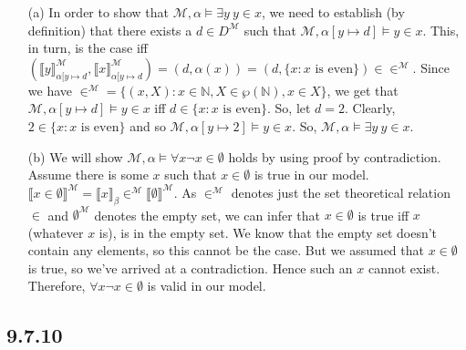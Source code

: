 \begin{enumerate}

  \item[(a)] In order to show that $\mathcal{M},\alpha\vDash \exists
    y~y\in x$, we need to establish (by definition) that there exists
    a $d\in D^\mathcal{M}$ such that $\mathcal{M},\alpha[y\mapsto
    d]\vDash y\in x$. This, in turn, is the case iff $(\llbracket
    y\rrbracket^\mathcal{M}_{\alpha[y\mapsto d}, \llbracket
    x\rrbracket^\mathcal{M}_{\alpha[y\mapsto d})=(d, \alpha(x))=(d,
    \{x:x\text{ is even}\})\in \in ^\mathcal{M}$. Since we have
    $\in^\mathcal{M}=\{(x,X): x\in \mathbb{N}, X\in \wp(\mathbb{N}),
    x\in X\}$, we get that $\mathcal{M},\alpha[y\mapsto
    d]\vDash y\in x$ iff $d\in \{x:x\text{ is even}\}$. So, let
    $d=2$. Clearly, $2\in \{x:x\text{ is even}\}$ and so $\mathcal{M},\alpha[y\mapsto
    2]\vDash y\in x$. So, $\mathcal{M},\alpha\vDash \exists
    y~y\in x$.

  \item[(b)] We will show $\mathcal{M}, \alpha \vDash \forall x \neg x
    \in \emptyset$ holds by using proof by contradiction. Assume there
    is some $x$ such that $x \in \emptyset$ is true in our
    model. $\llbracket x \in \emptyset \rrbracket^\mathcal{M} =
    \llbracket x \rrbracket_\beta \in^\mathcal{M} \llbracket
    \emptyset\rrbracket^\mathcal{M}$. As $\in^\mathcal{M}$ denotes
    just the set theoretical relation $\in$ and
    $\emptyset^\mathcal{M}$ denotes the empty set, we can infer that
    $x \in \emptyset$ is true iff $x$ (whatever $x$ is), is in the
    empty set. We know that the empty set doesn't contain any
    elements, so this cannot be the case. But we assumed that $x \in
    \emptyset$ is true, so we've arrived at a contradiction. Hence
    such an $x$ cannot exist. Therefore, $\forall x \neg x \in
    \emptyset$ is valid in our model.
\end{enumerate}

\subsection*{9.7.10}

